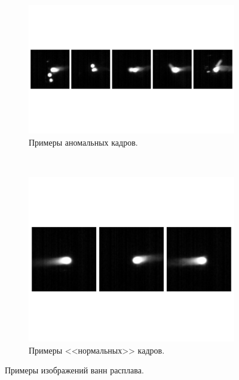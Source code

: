 \documentclass{article}
\begin{document}
    \begin{figure}[H]
        \centering
        \begin{subfigure}{.98\textwidth}
            \centering
            \includegraphics[scale=.5]{anomaly_examples.pdf}
            \caption{Примеры аномальных кадров.}\label{anomaly_examples}
        \end{subfigure}
        \\
        \centering
        \begin{subfigure}{.98\textwidth}
            \centering
            \includegraphics[scale=.48]{normal_examples.pdf}
            \caption{Примеры <<нормальных>> кадров.}\label{normal_examples}
        \end{subfigure}
        \caption{Примеры изображений ванн расплава.}\label{meltpool_examples}
    \end{figure}
\end{document}
